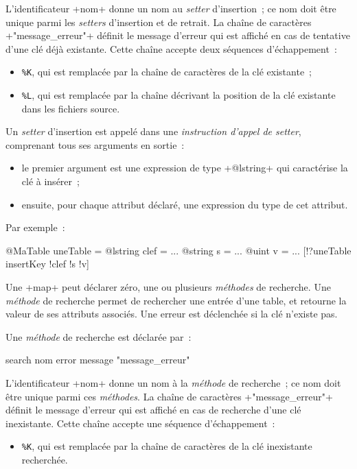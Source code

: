 L'identificateur \ggs+nom+ donne un nom au \emph{setter} d'insertion~; ce nom doit être unique parmi les \emph{setters} d'insertion et de retrait. La chaîne de caractères \ggs+"message_erreur"+ définit le message d'erreur qui est affiché en cas de tentative d'une clé déjà existante. Cette chaîne accepte deux séquences d'échappement~:
\begin{itemize}
  \item \texttt{\%K}, qui est remplacée par la chaîne de caractères de la clé existante~;
  \item \texttt{\%L}, qui est remplacée par la chaîne décrivant la position de la clé existante dans les fichiers source.
\end{itemize}


Un \emph{setter} d'insertion est appelé dans une \emph{instruction d'appel de setter}, comprenant tous ses arguments en sortie~:
\begin{itemize}
  \item le premier argument est une expression de type \ggs+@lstring+ qui caractérise la clé à insérer~;
  \item ensuite, pour chaque attribut déclaré, une expression du type de cet attribut.
\end{itemize}

Par exemple~:
\begin{galgas}
@MaTable uneTable = {}
@lstring clef = ...
@string s = ...
@uint v = ...
[!?uneTable insertKey !clef !s !v]
\end{galgas}












Une \ggs+map+ peut déclarer zéro, une ou plusieurs \emph{méthodes} de recherche. Une \emph{méthode} de recherche permet de rechercher une entrée d'une table, et retourne la valeur de ses attributs associés. Une erreur est déclenchée si la clé n'existe pas.


Une \emph{méthode} de recherche est déclarée par~:


\begin{galgas}
search nom error message "message_erreur"
\end{galgas}

L'identificateur \ggs+nom+ donne un nom à la \emph{méthode} de recherche~; ce nom doit être unique parmi ces \emph{méthodes}. La chaîne de caractères \ggs+"message_erreur"+ définit le message d'erreur qui est affiché en cas de recherche d'une clé inexistante. Cette chaîne accepte une séquence d'échappement~:
\begin{itemize}
  \item \texttt{\%K}, qui est remplacée par la chaîne de caractères de la clé inexistante recherchée.
\end{itemize}


